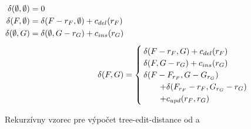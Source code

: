 
\begin{figure}
  \begin{subequations}
  \begin{align*}
    \begin{split}
    \delta(\emptyset, \emptyset) &=
      0
      \\
    \delta(F, \emptyset) &=
      \delta(F - r_{F}, \emptyset) + c_{del}(r_{F})
      \\
    \delta(\emptyset, G) &=
      \delta(\emptyset, G - r_{G}) + c_{ins}(r_{G})
    \end{split}
    \\[1ex]
    \delta(F, G) &=
      \begin{cases}
        \delta(F - r_{F}, G) + c_{del}(r_{F}) \\
        \delta(F, G - r_{G}) + c_{ins}(r_{G}) \\
        \delta(F - F_{r_{F}}, G - G_{r_{G}}) \\
          \quad \quad + \delta(F_{r_{F}} - r_{F}, G_{r_{G}} - r_{G}) \\
          \quad \quad + c_{upd}(r_{F}, r_{G})
      \end{cases}
  \end{align*}
  \end{subequations}
  \caption{Rekurzívny vzorec pre výpočet tree-edit-distance od \citet{DMRW} a \citet{RTED}}
  \label{eq:ted}
\end{figure}
